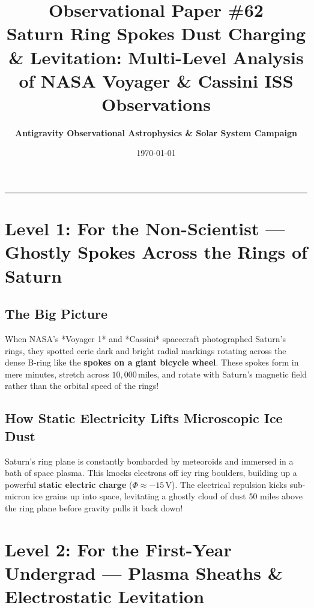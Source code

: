\documentclass[11pt,a4paper]{article}
\title{\Huge \textbf{Observational Paper \#62}\\ \Large Saturn Ring Spokes Dust Charging \& Levitation: Multi-Level Analysis of NASA Voyager \& Cassini ISS Observations}
\author{\textbf{Antigravity Observational Astrophysics \& Solar System Campaign}}
\date{\today}
\begin{document}
\maketitle

\vspace{-1em}
\begin{center}
\rule{\textwidth}{1.5pt}
\end{center}

\section*{Level 1: For the Non-Scientist — Ghostly Spokes Across the Rings of Saturn}

\subsection*{The Big Picture}
When NASA's *Voyager 1* and *Cassini* spacecraft photographed Saturn's rings, they spotted eerie dark and bright radial markings rotating across the dense B-ring like the \textbf{spokes on a giant bicycle wheel}. These spokes form in mere minutes, stretch across $10{,}000\,\text{miles}$, and rotate with Saturn's magnetic field rather than the orbital speed of the rings!

\subsection*{How Static Electricity Lifts Microscopic Ice Dust}
Saturn's ring plane is constantly bombarded by meteoroids and immersed in a bath of space plasma. This knocks electrons off icy ring boulders, building up a powerful \textbf{static electric charge} ($\Phi \approx -15\,\text{V}$). The electrical repulsion kicks sub-micron ice grains up into space, levitating a ghostly cloud of dust 50 miles above the ring plane before gravity pulls it back down!

\newpage

\section*{Level 2: For the First-Year Undergrad — Plasma Sheaths \& Electrostatic Levitation}
\end{document}
